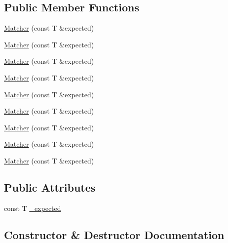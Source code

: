 \subsection*{Public Member Functions}
\begin{DoxyCompactItemize}
\item 
\mbox{\hyperlink{structfakeit_1_1ComparisonMatcherCreator_1_1Matcher_a12edd565f08f6b72931a5580f685f5dc}{Matcher}} (const T \&expected)
\item 
\mbox{\hyperlink{structfakeit_1_1ComparisonMatcherCreator_1_1Matcher_a12edd565f08f6b72931a5580f685f5dc}{Matcher}} (const T \&expected)
\item 
\mbox{\hyperlink{structfakeit_1_1ComparisonMatcherCreator_1_1Matcher_a12edd565f08f6b72931a5580f685f5dc}{Matcher}} (const T \&expected)
\item 
\mbox{\hyperlink{structfakeit_1_1ComparisonMatcherCreator_1_1Matcher_a12edd565f08f6b72931a5580f685f5dc}{Matcher}} (const T \&expected)
\item 
\mbox{\hyperlink{structfakeit_1_1ComparisonMatcherCreator_1_1Matcher_a12edd565f08f6b72931a5580f685f5dc}{Matcher}} (const T \&expected)
\item 
\mbox{\hyperlink{structfakeit_1_1ComparisonMatcherCreator_1_1Matcher_a12edd565f08f6b72931a5580f685f5dc}{Matcher}} (const T \&expected)
\item 
\mbox{\hyperlink{structfakeit_1_1ComparisonMatcherCreator_1_1Matcher_a12edd565f08f6b72931a5580f685f5dc}{Matcher}} (const T \&expected)
\item 
\mbox{\hyperlink{structfakeit_1_1ComparisonMatcherCreator_1_1Matcher_a12edd565f08f6b72931a5580f685f5dc}{Matcher}} (const T \&expected)
\item 
\mbox{\hyperlink{structfakeit_1_1ComparisonMatcherCreator_1_1Matcher_a12edd565f08f6b72931a5580f685f5dc}{Matcher}} (const T \&expected)
\end{DoxyCompactItemize}
\subsection*{Public Attributes}
\begin{DoxyCompactItemize}
\item 
const T \mbox{\hyperlink{structfakeit_1_1ComparisonMatcherCreator_1_1Matcher_a4e97c7e911012c527daebb533d7cf2ba}{\+\_\+expected}}
\end{DoxyCompactItemize}


\subsection{Constructor \& Destructor Documentation}
\mbox{\label{structfakeit_1_1ComparisonMatcherCreator_1_1Matcher_a12edd565f08f6b72931a5580f685f5dc}} 
